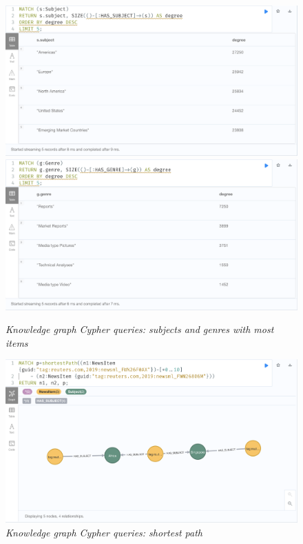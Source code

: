 \documentclass[11pt]{article}
\begin{document}
  \begin{figure}
    \includegraphics[scale=0.2]{02-subjects-with-most-items}
    \includegraphics[scale=0.2]{02-genres-with-most-items}
    \caption{\textit{Knowledge graph Cypher queries: subjects and genres with most items}}
  \end{figure}

  \begin{figure}
    \centerline{\includegraphics[scale=0.2]{03-shortest-path}}
    \caption{\textit{Knowledge graph Cypher queries: shortest path}}
  \end{figure}
\end{document}
